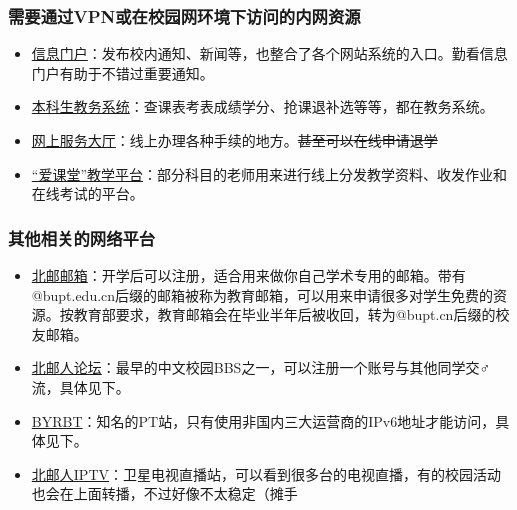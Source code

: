 \subsubsection*{需要通过VPN或在校园网环境下访问的内网资源}
\begin{itemize}
    \item \href{http://my.bupt.edu.cn/}{信息门户}：发布校内通知、新闻等，也整合了各个网站系统的入口。勤看信息门户有助于不错过重要通知。
    \item \href{https://jwgl.bupt.edu.cn/}{本科生教务系统}：查课表考表成绩学分、抢课退补选等等，都在教务系统。
    \item \href{https://service.bupt.edu.cn/}{网上服务大厅}：线上办理各种手续的地方。\sout{甚至可以在线申请退学}
    \item \href{https://iclass.bupt.edu.cn/}{“爱课堂”教学平台}：部分科目的老师用来进行线上分发教学资料、收发作业和在线考试的平台。
\end{itemize}

\subsubsection*{其他相关的网络平台}
\begin{itemize}
    \item \href{https://mail.bupt.edu.cn/}{北邮邮箱}：开学后可以注册，适合用来做你自己学术专用的邮箱。带有@bupt.edu.cn后缀的邮箱被称为教育邮箱，可以用来申请很多对学生免费的资源。按教育部要求，教育邮箱会在毕业半年后被收回，转为@bupt.cn后缀的校友邮箱。
    \item \href{https://bbs.byr.cn/}{北邮人论坛}：最早的中文校园BBS之一，可以注册一个账号与其他同学交♂流，具体见下。
    \item \href{https://byr.pt/}{BYRBT}：知名的PT站，只有使用非国内三大运营商的IPv6地址才能访问，具体见下。
    \item \href{http://tv.byr.cn/show}{北邮人IPTV}：卫星电视直播站，可以看到很多台的电视直播，有的校园活动也会在上面转播，不过好像不太稳定（摊手
\end{itemize}

